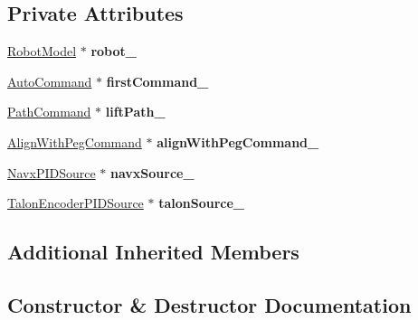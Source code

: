 \subsection*{Private Attributes}
\begin{DoxyCompactItemize}
\item 
\mbox{\label{class_one_gear_mode_ad1b467771c98dc4e3156aea381390a00}} 
\hyperlink{class_robot_model}{Robot\+Model} $\ast$ {\bfseries robot\+\_\+}
\item 
\mbox{\label{class_one_gear_mode_ad7d249a36949edf64d23759c626e4c98}} 
\hyperlink{class_auto_command}{Auto\+Command} $\ast$ {\bfseries first\+Command\+\_\+}
\item 
\mbox{\label{class_one_gear_mode_ac943774ff57a1a71e70edb174ed57d17}} 
\hyperlink{class_path_command}{Path\+Command} $\ast$ {\bfseries lift\+Path\+\_\+}
\item 
\mbox{\label{class_one_gear_mode_a622236cb11ee049a22db35761fe2b07f}} 
\hyperlink{class_align_with_peg_command}{Align\+With\+Peg\+Command} $\ast$ {\bfseries align\+With\+Peg\+Command\+\_\+}
\item 
\mbox{\label{class_one_gear_mode_a8d770f6dbe9a4895cc2c089325c979f0}} 
\hyperlink{class_navx_p_i_d_source}{Navx\+P\+I\+D\+Source} $\ast$ {\bfseries navx\+Source\+\_\+}
\item 
\mbox{\label{class_one_gear_mode_a1971e43e414dc22820e5db461f8f6a00}} 
\hyperlink{class_talon_encoder_p_i_d_source}{Talon\+Encoder\+P\+I\+D\+Source} $\ast$ {\bfseries talon\+Source\+\_\+}
\end{DoxyCompactItemize}
\subsection*{Additional Inherited Members}


\subsection{Constructor \& Destructor Documentation}
\mbox{\label{class_one_gear_mode_a738b0127f542fb89c5a5976e534b6ef9}} 
